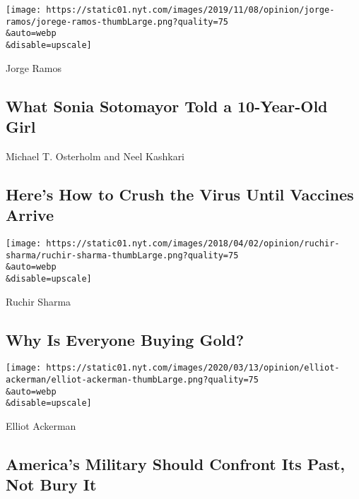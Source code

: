 \href{/2020/08/07/opinion/latina-women-politics.html}{}

\texttt{[image: https://static01.nyt.com/images/2019/11/08/opinion/jorge-ramos/jorege-ramos-thumbLarge.png?quality=75\\\&auto=webp\\\&disable=upscale]}

Jorge Ramos

\hypertarget{what-sonia-sotomayor-told-a-10-year-old-girl}{%
\subsection{What Sonia Sotomayor Told a 10-Year-Old
Girl}\label{what-sonia-sotomayor-told-a-10-year-old-girl}}

\href{/2020/08/07/opinion/coronavirus-lockdown-unemployment-death.html}{}

Michael T. Osterholm and Neel Kashkari

\hypertarget{heres-how-to-crush-the-virus-until-vaccines-arrive}{%
\subsection{Here's How to Crush the Virus Until Vaccines
Arrive}\label{heres-how-to-crush-the-virus-until-vaccines-arrive}}

\href{/2020/08/08/opinion/gold-investment-coronavirus.html}{}

\texttt{[image: https://static01.nyt.com/images/2018/04/02/opinion/ruchir-sharma/ruchir-sharma-thumbLarge.png?quality=75\\\&auto=webp\\\&disable=upscale]}

Ruchir Sharma

\hypertarget{why-is-everyone-buying-gold}{%
\subsection{Why Is Everyone Buying
Gold?}\label{why-is-everyone-buying-gold}}

\href{/2020/08/08/opinion/nazi-confederate-military-history-ksk.html}{}

\texttt{[image: https://static01.nyt.com/images/2020/03/13/opinion/elliot-ackerman/elliot-ackerman-thumbLarge.png?quality=75\\\&auto=webp\\\&disable=upscale]}

Elliot Ackerman

\hypertarget{americas-military-should-confront-its-past-not-bury-it}{%
\subsection{America's Military Should Confront Its Past, Not Bury
It}\label{americas-military-should-confront-its-past-not-bury-it}}

